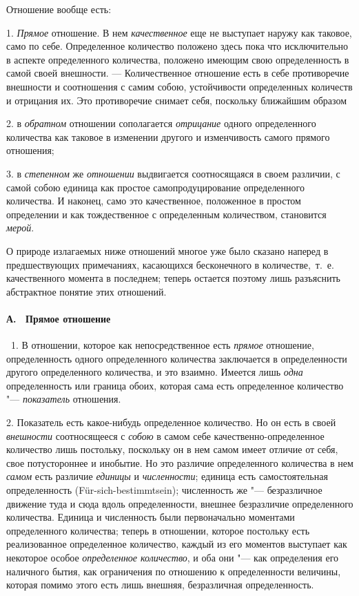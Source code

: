 Отношение вообще есть:

1. {\em Прямое} отношение. В нем
{\em качественное} еще не выступает наружу как таковое,
само по себе. Определенное количество положено здесь пока что исключительно
в аспекте определенного количества, положено имеющим свою определенность в
самой своей внешности. — Количественное отношение есть в себе противоречие
внешности и соотношения с самим собою, устойчивости определенных количеств
и отрицания их. Это противоречие снимает себя, поскольку ближайшим образом

2. в {\em обратном} отношении сополагается
{\em отрицание} одного определенного количества как
таковое в изменении другого и изменчивость самого прямого отношения;

3. в {\em степенном} же
{\em отношении} выдвигается соотносящаяся в своем
различии, с самой собою единица как простое самопродуцирование
определенного количества. И наконец, само это качественное, положенное в
простом определении и как тождественное с определенным количеством,
становится {\em мерой}.

О природе излагаемых ниже отношений многое уже было сказано наперед в
предшествующих примечаниях, касающихся бесконечного в количестве,~т.~е.
качественного момента в последнем; теперь остается поэтому лишь разъяснить
абстрактное понятие этих отношений.

\paragraph[А. \ Прямое отношение]{А. \ Прямое отношение}
\ 1. В отношении, которое как непосредственное есть
{\em прямое} отношение, определенность одного
определенного количества заключается в определенности другого определенного
количества, и это взаимно. Имеется лишь {\em одна}
определенность или граница обоих, которая сама есть определенное количество
"--- {\em показатель} отношения.

2. Показатель есть какое-нибудь определенное количество. Но он есть в своей
{\em внешности} соотносящееся с
{\em собою} в самом себе качественно-определенное
количество лишь постольку, поскольку он в нем самом имеет отличие от себя,
свое потустороннее и инобытие. Но это различие определенного количества в
нем {\em самом} есть различие
{\em единицы} и {\em численности};
единица есть самостоятельная определенность (Für-sich-bestimmtsein);
численность же "--- безразличное движение туда и сюда вдоль определенности,
внешнее безразличие определенного количества. Единица и численность были
первоначально моментами определенного количества; теперь в отношении,
которое постольку есть реализованное определенное количество, каждый из его
моментов выступает как некоторое особое
{\em определенное количество}, и оба они "--- как
определения его наличного бытия, как ограничения по отношению к
определенности величины, которая помимо этого есть лишь внешняя,
безразличная определенность.

